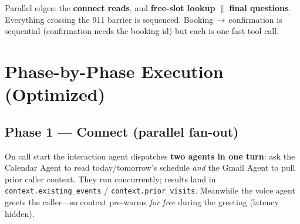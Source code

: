 \documentclass[11pt,a4paper]{article}
\begin{document}
\begin{center}
\end{center}

\noindent Parallel edges: the \textbf{connect reads}, and \textbf{free-slot lookup} $\parallel$ \textbf{final
questions}. Everything crossing the 911 barrier is sequenced. Booking\,$\rightarrow$\,confirmation is sequential
(confirmation needs the booking id) but each is one fast tool call.

\section{Phase-by-Phase Execution (Optimized)}

\subsection{Phase 1 --- Connect (parallel fan-out)}
On call start the interaction agent dispatches \textbf{two agents in one turn}: ask the Calendar Agent to read
today/tomorrow's schedule \emph{and} the Gmail Agent to pull prior caller context. They run concurrently;
results land in \texttt{context.existing\_events} / \texttt{context.prior\_visits}. Meanwhile the voice agent
greets the caller---so context pre-warms \emph{for free} during the greeting (latency hidden).
\end{document}
